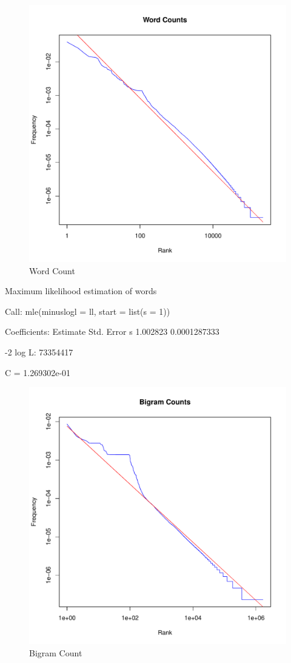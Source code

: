 \documentclass[10pt,letterpaper,bibliography=totoc]{scrartcl}
\begin{document}
\begin{figure}[!h]
\centering
\label{fig:wordcount}
\includegraphics[scale=.5]{wordcount.pdf}
\caption{Word Count}
\end{figure}

Maximum likelihood estimation of words

Call:
mle(minuslogl = ll, start = list(s = 1))

Coefficients:
  Estimate   Std. Error
s 1.002823 0.0001287333

-2 log L: 73354417 

C = 1.269302e-01

\hfill \linebreak
\begin{figure}[!h]
\centering
\label{fig:bigram}
\includegraphics[scale=.5]{bigram.pdf}
\caption{Bigram Count}
\end{figure}
\end{document}
